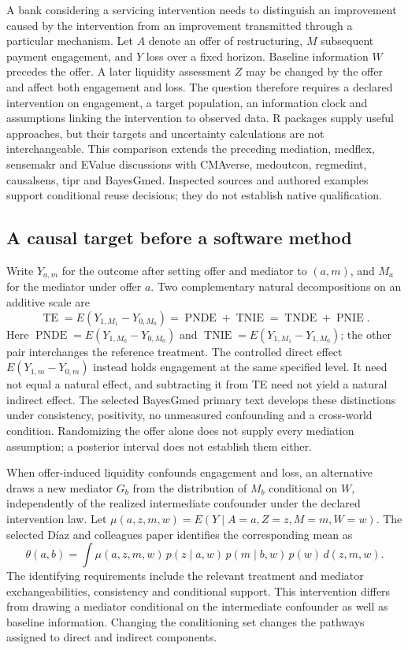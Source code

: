 A bank considering a servicing intervention needs to distinguish an improvement
caused by the intervention from an improvement transmitted through a particular
mechanism. Let $A$ denote an offer of restructuring, $M$ subsequent payment
engagement, and $Y$ loss over a fixed horizon. Baseline information $W$ precedes
the offer. A later liquidity assessment $Z$ may be changed by the offer and
affect both engagement and loss. The question therefore requires a declared
intervention on engagement, a target population, an information clock and
assumptions linking the intervention to observed data. R packages supply useful
approaches, but their targets and uncertainty calculations are not interchangeable.
This comparison extends the preceding mediation, medflex, sensemakr and EValue
discussions with CMAverse, medoutcon, regmedint, causalsens, tipr and BayesGmed.
Inspected sources and authored examples support conditional reuse decisions;
they do not establish native qualification. \citep{exec25_rmed_choice}

\subsection{A causal target before a software method}

Write $Y_{a,m}$ for the outcome after setting offer and mediator to $(a,m)$,
and $M_a$ for the mediator under offer $a$. Two complementary natural
decompositions on an additive scale are
\[
 \operatorname{TE}=E(Y_{1,M_1}-Y_{0,M_0})
 =\operatorname{PNDE}+\operatorname{TNIE}
 =\operatorname{TNDE}+\operatorname{PNIE}.
\]
Here $\operatorname{PNDE}=E(Y_{1,M_0}-Y_{0,M_0})$ and
$\operatorname{TNIE}=E(Y_{1,M_1}-Y_{1,M_0})$; the other pair interchanges the
reference treatment. The controlled direct effect $E(Y_{1,m}-Y_{0,m})$ instead
holds engagement at the same specified level. It need not equal a natural
effect, and subtracting it from TE need not yield a natural indirect effect.
The selected BayesGmed primary text develops these distinctions under consistency,
positivity, no unmeasured confounding and a cross-world condition. Randomizing
the offer alone does not supply every mediation assumption; a posterior interval
does not establish them either. \citep{exec25_rmed_yimer_paper}

When offer-induced liquidity confounds engagement and loss, an alternative
draws a new mediator $G_b$ from the distribution of $M_b$ conditional on $W$,
independently of the realized intermediate confounder under the declared
intervention law. Let $\mu(a,z,m,w)=E(Y\mid A=a,Z=z,M=m,W=w)$. The selected
D\'iaz and colleagues paper identifies the corresponding mean as
\[
 \theta(a,b)=\int \mu(a,z,m,w)\,p(z\mid a,w)\,
                  p(m\mid b,w)\,p(w)\,d(z,m,w).
\]
The identifying requirements include the relevant treatment and mediator
exchangeabilities, consistency and conditional support. This intervention
differs from drawing a mediator conditional on the intermediate confounder as
well as baseline information. Changing the conditioning set changes the
pathways assigned to direct and indirect components.
\citep{exec25_rmed_diaz_paper}

